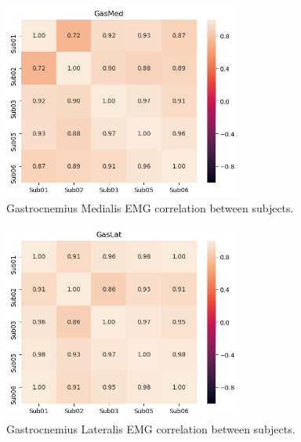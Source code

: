 \begin{figure}[ht!]
    \centering
    \includegraphics[width=0.7\textwidth]{img/results/correlations/GasMed_correlation_between_subjects.png}
    \caption{Gastrocnemius Medialis \ac{EMG} correlation between subjects.}
    \label{fig:gasmed-correlation}
\end{figure}
\begin{figure}[ht!]
    \centering
    \includegraphics[width=0.7\textwidth]{img/results/correlations/GasLat_correlation_between_subjects.png}
    \caption{Gastrocnemius Lateralis \ac{EMG} correlation between subjects.}
    \label{fig:gaslat-correlation}
\end{figure}

